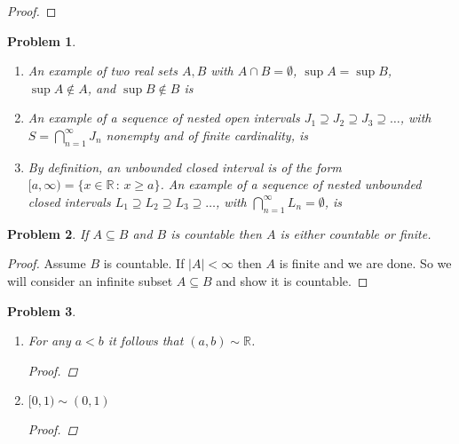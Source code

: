 \documentclass[12pt]{article}
\newtheorem{problem}{Problem}
\newcommand{\II}{\ensuremath{\mathbb I}}
\newcommand{\QQ}{\ensuremath{\mathbb Q}}
\newcommand{\RR}{\ensuremath{\mathbb R}}
\begin{document}
\begin{proof}
\end{proof}


\begin{problem} %
\phantom{foo}

\renewcommand{\labelenumi}{(\alph{enumi})}
\begin{enumerate}
\item An example of two real sets $A,B$ with $A\cap B=\emptyset$, $\sup A = \sup B$, $\sup A \notin A$, and $\sup B \notin B$ is
\item An example of a sequence of nested open intervals $J_1\supseteq J_2 \supseteq J_3 \supseteq \dots$, with $S=\bigcap_{n=1}^\infty J_n$ nonempty and of finite cardinality, is
\item By definition, an unbounded closed interval is of the form $[a,\infty) = \{x\in\RR \,:\, x \ge a\}$.  An example of a sequence of nested unbounded closed intervals $L_1\supseteq L_2 \supseteq L_3 \supseteq \dots$, with $\bigcap_{n=1}^\infty L_n = \emptyset$, is
\end{enumerate}
\end{problem}


\begin{problem} %
If $A\subseteq B$ and $B$ is countable then $A$ is either countable or finite.
\end{problem}


\begin{proof}
Assume $B$ is countable.  If $|A|<\infty$ then $A$ is finite and we are done.  So we will consider an infinite subset $A\subseteq B$ and show it is countable.
\end{proof}


\begin{problem} %
\phantom{foo}

\renewcommand{\labelenumi}{(\alph{enumi})}
\begin{enumerate}
\item For any $a<b$ it follows that $(a,b) \sim \RR$.

\begin{proof}
\end{proof}

\item $[0,1) \sim (0,1)$

\begin{proof}
\end{proof}

\end{enumerate}
\end{problem}
\end{document}
